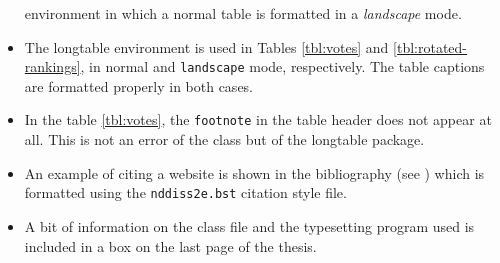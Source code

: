 \documentclass[textrefs,review]{nddiss2e}
\begin{document}
\begin{itemize}
environment in which a normal table is formatted in a {\em landscape} mode.
\item The \textsf{longtable} environment is used in Tables \ref{tbl:votes} and
\ref{tbl:rotated-rankings}, in normal and \verb+landscape+ mode, respectively. The
table captions are formatted properly in both cases.
\item In the table \ref{tbl:votes}, the \verb+footnote+ in the table header 
does not appear at all. This is not an error of the \nddiss\/ class but of the
\textsf{longtable} package.
\item An example of citing a website is shown in the bibliography (see
\citep{gairley2000}) which is formatted using the 
\verb+nddiss2e.bst+
citation style file.
\item A bit of information on the \nddiss\/ class file and the typesetting program
used is included in a box on the last page of the thesis.
\end{itemize}

%
%




%
%




%
%

\appendix




%
%


 \backmatter
 
 
\end{document}
